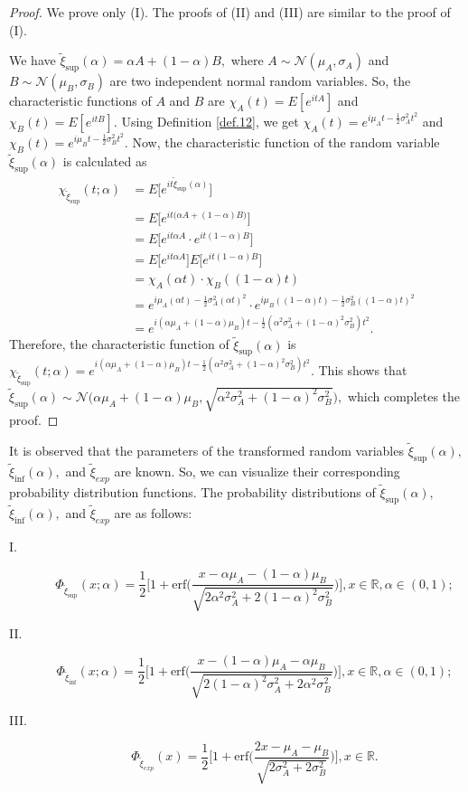 \begin{proof}
We prove only (I). The proofs of (II) and (III) are similar to the proof of (I).
\par We have $\tilde\xi_{\sup}(\alpha)=\alpha A+(1-\alpha)B,$ where $A\sim \mathcal{N}(\mu_A,\sigma_A)$ and $B\sim \mathcal{N}(\mu_B,\sigma_B)$ are two independent normal random variables. So, the characteristic functions of $A$ and $B$ are $\chi_A(t)=E[e^{itA}]$ and $\chi_B(t)=E[e^{itB}].$ Using Definition \ref{def.12}, we get $\chi_A(t)=e^{i\mu_At-\frac{1}{2}\sigma_A^2t^2}$ and $\chi_B(t)=e^{i\mu_Bt-\frac{1}{2}\sigma_B^2t^2}.$ Now, the characteristic function of the random variable $\tilde\xi_{\sup}(\alpha)$ is calculated as 
	\begin{equation*} 
	\begin{aligned}
		\chi_{\tilde\xi_{\sup}}(t;\alpha)&=E\big[e^{it\tilde\xi_{\sup}(\alpha)}\big]\\
		&=E\bigg[e^{it\big(\alpha A+(1-\alpha)B\big)}\bigg]\\
		&=E\big[e^{it\alpha A}\cdot e^{it(1-\alpha)B}\big]\\
		&=E\big[e^{it\alpha A}\big]E\big[ e^{it(1-\alpha)B}\big]\\
		&=\chi_A(\alpha t)\cdot\chi_B((1-\alpha)t)\\
		&=e^{i\mu_A(\alpha t)-\frac{1}{2}\sigma_A^2(\alpha t)^2}\cdot e^{i\mu_B((1-\alpha)t)-\frac{1}{2}\sigma_B^2((1-\alpha)t)^2}\\
		&=e^{i(\alpha \mu_A+(1-\alpha)\mu_B)t-\frac{1}{2}(\alpha^2\sigma_A^2+(1-\alpha)^2\sigma_B^2)t^2}.
	\end{aligned}
\end{equation*}
Therefore, the characteristic function of $\tilde\xi_{\sup}(\alpha)$ is $\chi_{\tilde\xi_{\sup}}(t;\alpha)=e^{i(\alpha \mu_A+(1-\alpha)\mu_B)t-\frac{1}{2}(\alpha^2\sigma_A^2+(1-\alpha)^2\sigma_B^2)t^2}.$ This shows that $\tilde\xi_{\sup}(\alpha)\sim \mathcal{N}\big(\alpha\mu_A+(1-\alpha)\mu_B,\sqrt{\alpha^2\sigma_A^2+(1-\alpha)^2\sigma_B^2}\big),$ which completes the proof.
\end{proof}
\par It is observed that the parameters of the transformed random variables $\tilde\xi_{\sup}(\alpha),$ $\tilde\xi_{\inf}(\alpha),$ and $\tilde\xi_{exp}$ are known. So, we can visualize their corresponding probability distribution functions. The probability distributions of $\tilde\xi_{\sup}(\alpha),$ $\tilde\xi_{\inf}(\alpha),$ and $\tilde\xi_{exp}$ are as follows:
	\begin{description}
	\item[ I.] \[\Phi_{\tilde\xi_{\sup}}(x;\alpha)=\frac{1}{2}\bigg[1+\text{erf}\bigg(\frac{x-\alpha\mu_A-(1-\alpha)\mu_B}{\sqrt{2\alpha^2\sigma_A^2+2(1-\alpha)^2\sigma_B^2}}\bigg)\bigg], x\in\mathbb{R},\alpha\in (0,1);
	\]
	\item[ II.] \[\Phi_{\tilde\xi_{\inf}}(x;\alpha)=\frac{1}{2}\bigg[1+\text{erf}\bigg(\frac{x-(1-\alpha)\mu_A-\alpha\mu_B}{\sqrt{2(1-\alpha)^2\sigma_A^2+2\alpha^2\sigma_B^2}}\bigg)\bigg], x\in\mathbb{R},\alpha\in (0,1);
	\]
	\item[ III.] \[\Phi_{\tilde\xi_{exp}}(x)=\frac{1}{2}\bigg[1+\text{erf}\bigg(\frac{2x-\mu_A-\mu_B}{\sqrt{2\sigma_A^2+2\sigma_B^2}}\bigg)\bigg], x\in\mathbb{R}.
	\]
\end{description} 
